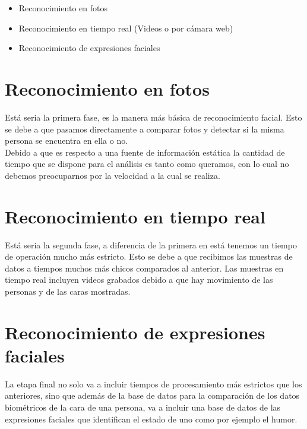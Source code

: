 \begin{itemize}
	\item Reconocimiento en fotos
	\item Reconocimiento en tiempo real (Videos o por cámara web)
	\item Reconocimiento de expresiones faciales
\end{itemize}

\section{Reconocimiento en fotos}

Está seria la primera fase, es la manera más básica de reconocimiento facial. Esto se debe a que pasamos directamente a comparar fotos y detectar si la misma persona se encuentra en ella o no.\\
Debido a que es respecto a una fuente de información estática la cantidad de tiempo que se dispone para el análisis es tanto como queramos, con lo cual no debemos preocuparnos por la velocidad a la cual se realiza.\\

\section{Reconocimiento en tiempo real}

Está seria la segunda fase, a diferencia de la primera en está tenemos un tiempo de operación mucho más estricto. Esto se debe a que recibimos las muestras de datos a tiempos muchos más chicos comparados al anterior. Las muestras en tiempo real incluyen videos grabados debido a que hay movimiento de las personas y de las caras mostradas.

\section{Reconocimiento de expresiones faciales}

La etapa final no solo va a incluir tiempos de procesamiento más estrictos que los anteriores, sino que además de la base de datos para la comparación de los datos biométricos de la cara de una persona, va a incluir una base de datos de las expresiones faciales que identifican el estado de uno como por ejemplo el humor.